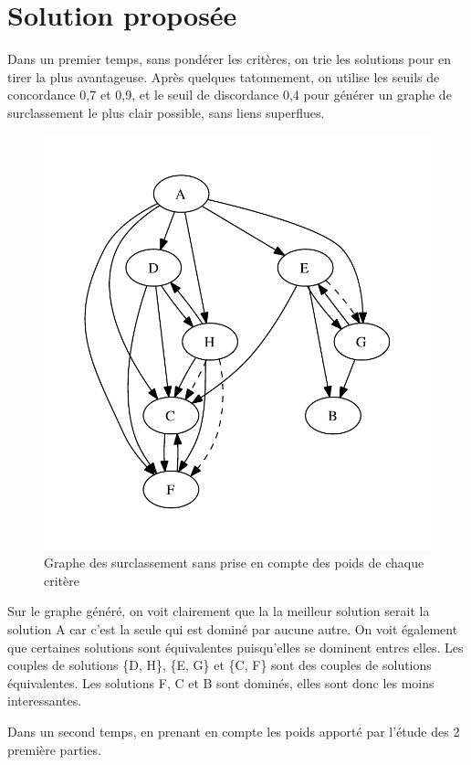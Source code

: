 \section{Solution proposée}

Dans un premier temps, sans pondérer les critères, on trie les solutions pour en tirer la plus avantageuse.
Après quelques tatonnement, on utilise les seuils de concordance 0,7 et 0,9, et le seuil de discordance 0,4 pour générer un graphe de surclassement le plus clair possible, sans liens superflues.

\begin{figure}[!ht]
\includegraphics{../SourcesMatlab/electre3-1.pdf}
\caption{Graphe des surclassement sans prise en compte des poids de chaque critère}
\end{figure}

Sur le graphe généré, on voit clairement que la la meilleur solution serait la solution A car c'est la seule qui est dominé par aucune autre.
On voit également que certaines solutions sont équivalentes puisqu'elles se dominent entres elles. Les couples de solutions \{D, H\}, \{E, G\} et \{C, F\} sont des couples de solutions équivalentes.
Les solutions F, C et B sont dominés, elles sont donc les moins interessantes.


Dans un second temps, en prenant en compte les poids apporté par l'étude des 2 première parties.
